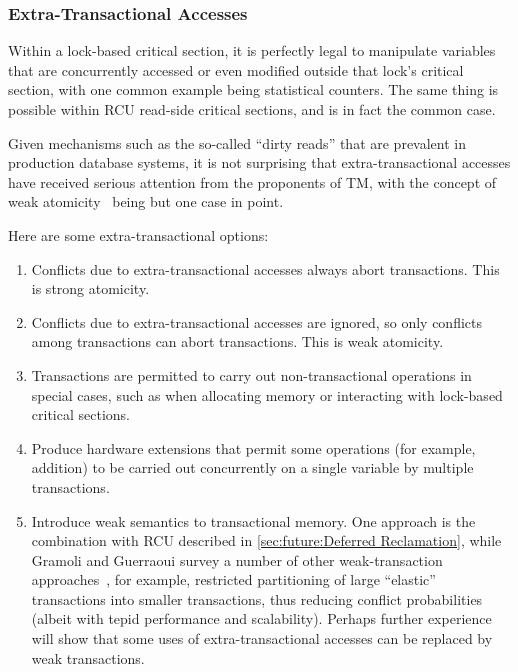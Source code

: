 \subsubsection{Extra-Transactional Accesses}
\label{sec:future:Extra-Transactional Accesses}

Within a lock-based critical section, it is perfectly legal to manipulate
variables that are concurrently accessed or even modified outside that
lock's critical section, with one common example being statistical
counters.
The same thing is possible within RCU read-side critical
sections, and is in fact the common case.

Given mechanisms such as the so-called ``dirty reads'' that are
prevalent in production database systems, it is not surprising
that extra-transactional accesses have received serious attention
from the proponents of TM, with the concept of weak
atomicity~\cite{Blundell2006TMdeadlock} being but one case in point.

Here are some extra-transactional options:

\begin{enumerate}
\item	Conflicts due to extra-transactional accesses always abort
	transactions.
	This is strong atomicity.
\item	Conflicts due to extra-transactional accesses are ignored,
	so only conflicts among transactions can abort transactions.
	This is weak atomicity.
\item	Transactions are permitted to carry out non-transactional
	operations in special cases, such as when allocating memory or
	interacting with lock-based critical sections.
\item	Produce hardware extensions that permit some operations
	(for example, addition) to be carried out concurrently on a
	single variable by multiple transactions.
\item	Introduce weak semantics to transactional memory.
	One approach is the combination with RCU described in
	\cref{sec:future:Deferred Reclamation},
	while Gramoli and Guerraoui
	survey a number of other weak-transaction
	approaches~\cite{Gramoli:2014:DTP:2541883.2541900}, for example,
	restricted partitioning of large
	``elastic'' transactions into smaller transactions, thus
	reducing conflict probabilities (albeit with tepid performance
	and scalability).
	Perhaps further experience will show that some uses of
	extra-transactional accesses can be replaced by weak
	transactions.
\end{enumerate}

